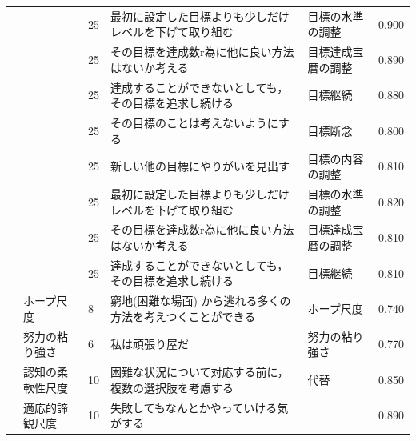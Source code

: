 \begin{landscape}
\begin{longtable}{p{2cm}p{2cm}p{2cm}p{6cm}p{2cm}p{2cm}}
		                         &                                  & 25  & 最初に設定した目標よりも少しだけレベルを下げて取り組む                         & 目標の水準の調整             & 0.900      \\
		                         &                                  & 25  & その目標を達成数r為に他に良い方法はないか考える                            & 目標達成宝暦の調整            & 0.890      \\
		                         &                                  & 25  & 達成することができないとしても，その目標を追求し続ける                         & 目標継続                 & 0.880      \\
		                         &                                  & 25  & その目標のことは考えないようにする                                   & 目標断念                 & 0.800      \\
		                         &                                  & 25  & 新しい他の目標にやりがいを見出す                                    & 目標の内容の調整             & 0.810      \\
		                         &                                  & 25  & 最初に設定した目標よりも少しだけレベルを下げて取り組む                         & 目標の水準の調整             & 0.820      \\
		                         &                                  & 25  & その目標を達成数r為に他に良い方法はないか考える                            & 目標達成宝暦の調整            & 0.810      \\
		                         &                                  & 25  & 達成することができないとしても，その目標を追求し続ける                         & 目標継続                 & 0.810      \\
		                         & ホープ尺度                            & 8   & 窮地(困難な場面) から逃れる多くの方法を考えつくことができる                     & ホープ尺度                & 0.740      \\
		                         & 努力の粘り強さ                          & 6   & 私は頑張り屋だ                                             & 努力の粘り強さ              & 0.770      \\
		                         & 認知の柔軟性尺度                         & 10  & 困難な状況について対応する前に，複数の選択肢を考慮する                         & 代替                   & 0.850      \\
		                         & 適応的諦観尺度                          & 10  & 失敗してもなんとかやっていける気がする                                 &                      & 0.890      \\

\end{longtable}
\end{landscape}
